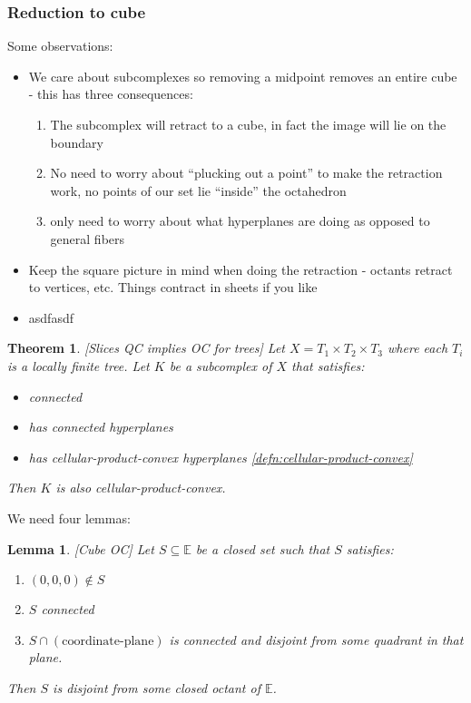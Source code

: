 \documentclass{article}
\theoremstyle{mystyle}
\newtheorem{thm}{Theorem}[section]
\newtheorem{lem}{Lemma}[section]
\theoremstyle{remark}
\begin{document}
\subsubsection{Reduction to cube}

Some observations:
\begin{itemize}
	\item We care about subcomplexes so removing a midpoint removes an entire cube - this has three consequences:
		\begin{enumerate}
			\item The subcomplex will retract to a cube, in fact the image will lie on the boundary
			\item No need to worry about ``plucking out a point'' to make the retraction work, no points of our set lie ``inside'' the octahedron
			\item only need to worry about what hyperplanes are doing as opposed to general fibers
		\end{enumerate}
	\item Keep the square picture in mind when doing the retraction - octants retract to vertices, etc. Things contract in sheets if you like
	\item asdfasdf
\end{itemize}

\begin{thm}
	\label{thm:QCOC}
    [Slices QC implies OC for trees]
	Let \(X=T_{1} \times T_{2} \times T_{3}\) where each \(T_{i}\) is a locally finite tree. Let \(K\) be a subcomplex of \(X\) that satisfies: 
	\begin{itemize}
		\item connected
		\item has connected hyperplanes
		\item has cellular-product-convex hyperplanes \ref{defn:cellular-product-convex}
	\end{itemize}
Then \(K\) is also cellular-product-convex.
\end{thm}
We need four lemmas:

\begin{lem}
	\label{lem:cubeOC}
	[Cube OC] Let \(S \subseteq \mathbb{E}  \) be a closed set such that \(S\) satisfies: 
	\begin{enumerate}
		\item \((0,0,0) \not\in S\) 
		\item \(S\) connected
		\item \(S \cap (\text{coordinate-plane})\) is connected and disjoint from some quadrant in that plane.
	\end{enumerate}
	Then \(S\) is disjoint from some closed octant of \(\mathbb{E}\). 
\end{lem}
\end{document}

